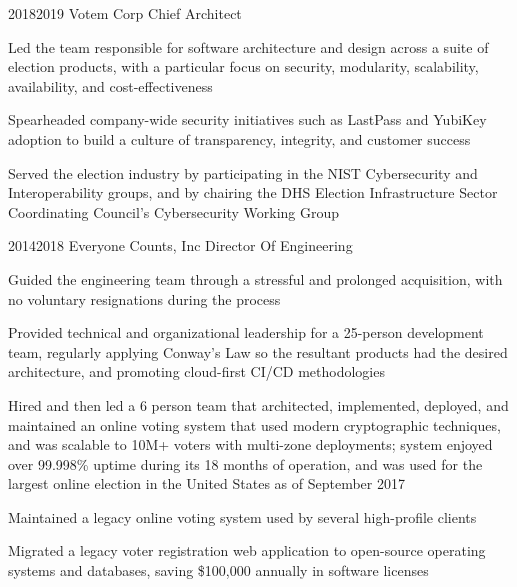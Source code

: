 \job
  {2018}{2019}
  {Votem Corp}
  {Chief Architect}
  {\begin{achievements}
    \item Led the team responsible for software architecture and design across a suite of election products, with a particular focus on security, modularity, scalability, availability, and cost-effectiveness
    \item Spearheaded company-wide security initiatives such as LastPass and YubiKey adoption to build a culture of transparency, integrity, and customer success
    \item Served the election industry by participating in the NIST Cybersecurity and Interoperability groups, and by chairing the DHS Election Infrastructure Sector Coordinating Council's Cybersecurity Working Group
  \end{achievements}}

\pagebreak

\job
  {2014}{2018}
  {Everyone Counts, Inc}
  {Director Of Engineering}
  {\begin{achievements}
    \item Guided the engineering team through a stressful and prolonged acquisition, with no voluntary resignations during the process
    \item Provided technical and organizational leadership for a 25-person development team, regularly applying Conway's Law so the resultant products had the desired architecture, and promoting cloud-first CI/CD methodologies
    \item Hired and then led a 6 person team that architected, implemented, deployed, and maintained an online voting system that used modern cryptographic techniques, and was scalable to 10M+ voters with multi-zone deployments; system enjoyed over 99.998\% uptime during its 18 months of operation, and was used for the largest online election in the United States as of September 2017
    \item Maintained a legacy online voting system used by several high-profile clients
    \item Migrated a legacy voter registration web application to open-source operating systems and databases, saving \$100,000 annually in software licenses
  \end{achievements}}

